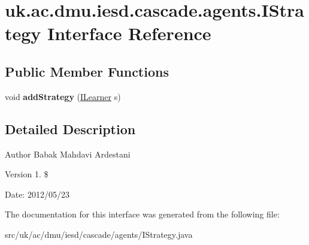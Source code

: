 \hypertarget{interfaceuk_1_1ac_1_1dmu_1_1iesd_1_1cascade_1_1agents_1_1_i_strategy}{\section{uk.\-ac.\-dmu.\-iesd.\-cascade.\-agents.\-I\-Strategy Interface Reference}
\label{interfaceuk_1_1ac_1_1dmu_1_1iesd_1_1cascade_1_1agents_1_1_i_strategy}
}
\subsection*{Public Member Functions}
\begin{DoxyCompactItemize}
\item 
\hypertarget{interfaceuk_1_1ac_1_1dmu_1_1iesd_1_1cascade_1_1agents_1_1_i_strategy_a79d2a87030075a20abf680f0d8de973d}{void {\bfseries add\-Strategy} (\hyperlink{classuk_1_1ac_1_1dmu_1_1iesd_1_1cascade_1_1agents_1_1_i_learner}{I\-Learner} s)}\label{interfaceuk_1_1ac_1_1dmu_1_1iesd_1_1cascade_1_1agents_1_1_i_strategy_a79d2a87030075a20abf680f0d8de973d}

\end{DoxyCompactItemize}


\subsection{Detailed Description}
\begin{DoxyAuthor}{Author}
Babak Mahdavi Ardestani 
\end{DoxyAuthor}
\begin{DoxyVersion}{Version}
1. \$ 
\end{DoxyVersion}
\begin{DoxyParagraph}{Date\-:}
2012/05/23 
\end{DoxyParagraph}


The documentation for this interface was generated from the following file\-:\begin{DoxyCompactItemize}
\item 
src/uk/ac/dmu/iesd/cascade/agents/I\-Strategy.\-java\end{DoxyCompactItemize}
